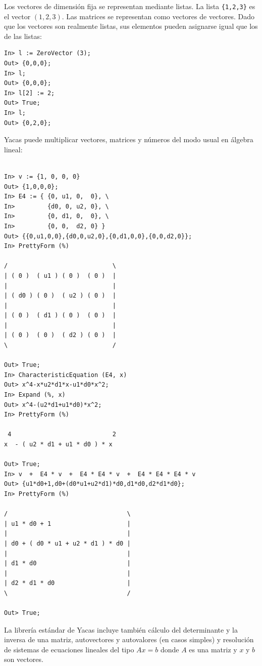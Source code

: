 Los  vectores  de  dimensión  fija  se  representan  mediante  listas.
La  lista  \verb+{1,2,3}+ es  el  vector  $(1,2,3)$. Las  matrices  se
representan  como vectores  de  vectores. Dado  que  los vectores  son
realmente listas, sus elementos pueden  asignarse igual que los de las
listas:

\begin{verbatim}
In> l := ZeroVector (3);
Out> {0,0,0};
In> l;
Out> {0,0,0};
In> l[2] := 2;
Out> True;
In> l;
Out> {0,2,0};
\end{verbatim}

Yacas puede multiplicar vectores, matrices y números del modo usual en
álgebra lineal:

\begin{verbatim}

In> v := {1, 0, 0, 0}
Out> {1,0,0,0};
In> E4 := { {0, u1, 0,  0}, \
In>         {d0, 0, u2, 0}, \
In>         {0, d1, 0,  0}, \
In>         {0, 0,  d2, 0} }
Out> {{0,u1,0,0},{d0,0,u2,0},{0,d1,0,0},{0,0,d2,0}};
In> PrettyForm (%)

/                             \
| ( 0 )  ( u1 ) ( 0 )  ( 0 )  |
|                             |
| ( d0 ) ( 0 )  ( u2 ) ( 0 )  |
|                             |
| ( 0 )  ( d1 ) ( 0 )  ( 0 )  |
|                             |
| ( 0 )  ( 0 )  ( d2 ) ( 0 )  |
\                             /

Out> True;
In> CharacteristicEquation (E4, x)
Out> x^4-x*u2*d1*x-u1*d0*x^2;
In> Expand (%, x)
Out> x^4-(u2*d1+u1*d0)*x^2;
In> PrettyForm (%)

 4                            2
x  - ( u2 * d1 + u1 * d0 ) * x 

Out> True;
In> v  +  E4 * v  +  E4 * E4 * v  +  E4 * E4 * E4 * v
Out> {u1*d0+1,d0+(d0*u1+u2*d1)*d0,d1*d0,d2*d1*d0};
In> PrettyForm (%)

/                                 \
| u1 * d0 + 1                     |
|                                 |
| d0 + ( d0 * u1 + u2 * d1 ) * d0 |
|                                 |
| d1 * d0                         |
|                                 |
| d2 * d1 * d0                    |
\                                 /

Out> True;
\end{verbatim}

La librería estándar de Yacas incluye también cálculo del determinante
y  la inversa  de una  matriz,  autovectores y  autovalores (en  casos
simples) y resolución de sistemas  de ecuaciones lineales del tipo $Ax
= b$ donde $A$ es una matriz y $x$ y $b$ son vectores.



